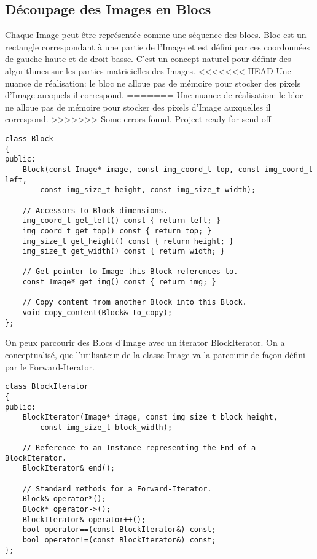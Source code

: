 \documentclass[a4paper]{article}
\begin{document}
\subsection{D\'ecoupage des Images en Blocs}
Chaque Image peut-\^etre repr\'esent\'ee comme une s\'equence des blocs.
Bloc est un rectangle correspondant \`a une partie de l'Image et est d\'efini par ces coordonn\'ees de gauche-haute et de droit-basse.
C'est un concept naturel pour d\'efinir des algorithmes sur les parties matricielles des Images.
<<<<<<< HEAD
Une nuance de r\'ealisation: le bloc ne alloue pas de m\'emoire pour stocker des pixels d'Image auxquels il correspond.
=======
Une nuance de r\'ealisation: le bloc ne alloue pas de m\'emoire pour stocker des pixels d'Image auxquelles il correspond.
>>>>>>> Some errors found. Project ready for send off

\begin{lstlisting}
class Block
{
public:
	Block(const Image* image, const img_coord_t top, const img_coord_t left,
		const img_size_t height, const img_size_t width);
		
	// Accessors to Block dimensions.
	img_coord_t get_left() const { return left; }
	img_coord_t get_top() const { return top; }
	img_size_t get_height() const { return height; }
	img_size_t get_width() const { return width; }
	
	// Get pointer to Image this Block references to.
	const Image* get_img() const { return img; }
	
	// Copy content from another Block into this Block.
	void copy_content(Block& to_copy);
};
\end{lstlisting}

On peux parcourir des Blocs d'Image avec un iterator BlockIterator.
On a conceptualis\'e, que l'utilisateur de la classe Image va la parcourir de fa\c{c}on d\'efini par le Forward-Iterator.

\begin{lstlisting}
class BlockIterator
{
public:
	BlockIterator(Image* image, const img_size_t block_height,
		const img_size_t block_width);

	// Reference to an Instance representing the End of a BlockIterator.	
	BlockIterator& end();

	// Standard methods for a Forward-Iterator.
	Block& operator*();
	Block* operator->();
	BlockIterator& operator++();
	bool operator==(const BlockIterator&) const;
	bool operator!=(const BlockIterator&) const;
};
\end{lstlisting}
\end{document}
